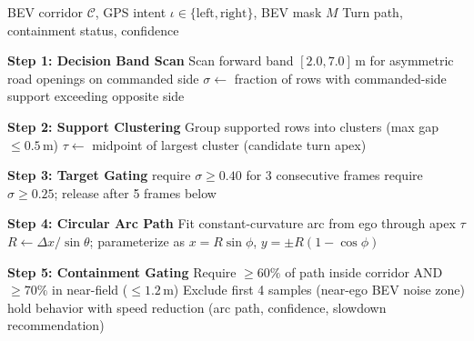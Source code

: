 \documentclass[12pt,letterpaper,oneside]{report}
\begin{document}
\begin{algorithm}[H]
\caption{GPS-Conditioned Waypoint-Turn Planner}
\label{alg:waypoint_turn}
\begin{algorithmic}[1]
\Require BEV corridor $\mathcal{C}$, GPS intent $\iota \in \{\text{left}, \text{right}\}$, BEV mask $M$
\Ensure Turn path, containment status, confidence

\Statex \textbf{Step 1: Decision Band Scan}
\State Scan forward band $[2.0, 7.0]$\,m for asymmetric road openings on commanded side
\State $\sigma \gets$ fraction of rows with commanded-side support exceeding opposite side

\Statex \textbf{Step 2: Support Clustering}
\State Group supported rows into clusters (max gap $\le 0.5$\,m)
\State $\tau \gets$ midpoint of largest cluster (candidate turn apex)

\Statex \textbf{Step 3: Target Gating}
 require $\sigma \ge 0.40$ for 3 consecutive frames
 require $\sigma \ge 0.25$; release after 5 frames below
\EndIf

\Statex \textbf{Step 4: Circular Arc Path}
\State Fit constant-curvature arc from ego through apex $\tau$
\State $R \gets \Delta x / \sin\theta$; parameterize as $x = R\sin\phi$, $y = \pm R(1-\cos\phi)$

\Statex \textbf{Step 5: Containment Gating}
\State Require $\ge 60\%$ of path inside corridor AND $\ge 70\%$ in near-field ($\le 1.2$\,m)
\State Exclude first 4 samples (near-ego BEV noise zone)
 \Return hold behavior with speed reduction \EndIf
\State \Return (arc path, confidence, slowdown recommendation)
\end{algorithmic}
\end{algorithm}





\end{document}
